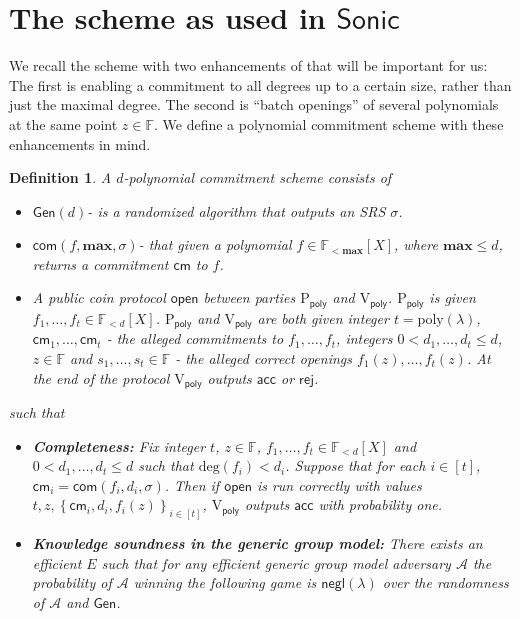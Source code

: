 \documentclass[11pt]{article}
\numberwithin{figure}{section} %
\newtheorem{dfn}[thm]{Definition}
\renewcommand{\max}{\ensuremath{\mathrm{\mathbf{max}}}\xspace}
\newcommand{\set}[1]{\ensuremath{\left\{#1\right\}}\xspace}
\newcommand{\poly}{\ensuremath{\mathrm{poly}(\lambda)}\xspace}
\newcommand{\F}{\ensuremath{\mathbb F}\xspace}
\newcommand{\adv}{\ensuremath{\mathcal A}\xspace}
\renewcommand{\deg}{\ensuremath{\mathrm{deg}}\xspace}
\newcommand{\negl}{\ensuremath{\mathsf{negl}(\lambda)}\xspace}
\newcommand{\rej}{\ensuremath{\mathsf{rej}}\xspace}
\newcommand{\acc}{\ensuremath{\mathsf{acc}}\xspace}
\newcommand{\sett}[2]{\ensuremath{\set{#1}_{#2}}\xspace}
\newcommand{\gen}{\ensuremath{\mathsf{Gen}}\xspace}
\newcommand{\prvpoly}{\ensuremath{\mathrm{P_{\mathsf{poly}}}}\xspace}
\newcommand{\verpoly}{\ensuremath{\mathrm{V_{\mathsf{poly}}}}\xspace}
\newcommand{\sonic}{\ensuremath{\mathsf{Sonic}}\xspace}
\newcommand{\ext}{\ensuremath{E}\xspace}
\newcommand{\polysofdeg}[1]{\ensuremath{\F_{< #1}[X]}\xspace}
\begin{document}
\section{The \cite{kate} scheme as used in \sonic}\label{sec:kate}
We recall the \cite{kate} scheme with two enhancements of \cite{sonic} that will be important for us: The first is enabling a commitment to all degrees up to a certain size, rather than just the maximal degree. The second is ``batch openings'' of several polynomials at the same point $z\in \F$.
We define a polynomial commitment scheme with these enhancements in mind.
\newcommand{\srs}{\ensuremath{\sigma}\xspace}
\newcommand{\com}{\ensuremath{\mathsf{com}}\xspace}
\newcommand{\cm}{\ensuremath{\mathsf{cm}}\xspace}
\newcommand{\open}{\ensuremath{\mathsf{open}}\xspace}
\begin{dfn}\label{dfn:PCscheme}
A $d$-polynomial commitment scheme consists of 
\begin{itemize}
 \item $\gen(d)$- is a randomized algorithm that outputs an SRS \srs.
 \item $\com(f,\max,\srs)$- that given a polynomial $f\in \polysofdeg{\max}$, where $\max\leq d$, returns a commitment \cm to $f$.
 \item A public coin protocol  \open between parties \prvpoly and \verpoly. \prvpoly is given $ f_1,\ldots,f_t \in \polysofdeg{d}$. \prvpoly and \verpoly are both given integer $t=\poly$, $\cm_1,\ldots,\cm_t$ - the alleged commitments to $f_1,\ldots,f_t$, integers $0< d_1,\ldots,d_t \leq d$, $z\in\F$ and $s_1,\ldots,s_t\in \F$ - the alleged correct openings $f_1(z),\ldots,f_t(z)$. At the end of the protocol \verpoly outputs \acc or \rej. 
\end{itemize}
such that
\begin{itemize}
 \item \textbf{Completeness:} Fix integer $t$, $z\in \F$, $f_1,\ldots,f_t \in \polysofdeg{d}$ and $0< d_1,\ldots,d_t\leq d$
 such that $\deg(f_i)<d_i$.
 Suppose that for each $i\in [t]$, $\cm_i = \com(f_i,d_i,\srs)$.  Then if \open is run correctly with values
 $t,z, \sett{\cm_i,d_i,f_i(z)}{i\in [t]}$, \verpoly outputs \acc with probability one.
 \item \textbf{Knowledge soundness in the generic group model:} There exists an efficient \ext such that for any efficient generic group model adversary \adv the probability of $\adv$ winning the following game is \negl over the randomness of \adv and \gen.
 \begin{enumerate}

\end{enumerate}
\end{itemize}
\end{dfn}
\end{document}
